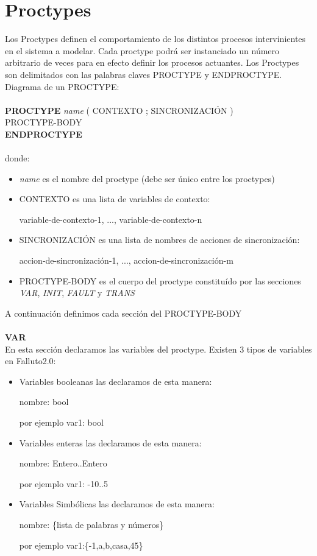 \documentclass[titlepage, 12pt]{book}
\begin{document}
\section{Proctypes}
Los Proctypes definen el comportamiento de los distintos procesos intervinientes en el sistema a modelar. Cada proctype podr\'a ser instanciado un n\'umero arbitrario de veces para en efecto definir los procesos actuantes.
Los Proctypes son delimitados con las palabras claves PROCTYPE y ENDPROCTYPE.
Diagrama de un PROCTYPE:\\\\
\textbf{PROCTYPE} \textit{name} ( CONTEXTO ; SINCRONIZACI\'ON )\\
\indent PROCTYPE-BODY\\
\textbf{ENDPROCTYPE}\\\\
donde:\\
\begin{itemize}
\item \emph{name} es el nombre del proctype (debe ser \'unico entre los proctypes)\\
\item CONTEXTO es una lista de variables de contexto:
\begin{center} variable-de-contexto-1, ..., variable-de-contexto-n\\ \end{center}
\item SINCRONIZACI\'ON es una lista de nombres de acciones de sincronizaci\'on:
\begin{center} accion-de-sincronizaci\'on-1, ..., accion-de-sincronizaci\'on-m\\ \end{center}
\item PROCTYPE-BODY es el cuerpo del proctype constitu\'ido por las secciones \emph{VAR}, \emph{INIT}, \emph{FAULT} y \emph{TRANS}
\end{itemize}

\noindent A continuaci\'on definimos cada secci\'on del PROCTYPE-BODY\\\\
\textbf{VAR}\\
\indent En esta secci\'on declaramos las variables del proctype. Existen 3 tipos de variables en Falluto2.0:
\begin{itemize}
\item Variables booleanas
las declaramos de esta manera: \begin{center} nombre: bool \end{center}
por ejemplo var1: bool
\item Variables enteras
las declaramos de esta manera: \begin{center} nombre: Entero..Entero \end{center}
por ejemplo var1: -10..5
\item Variables Simb\'olicas
las declaramos de esta manera: \begin{center} nombre: \{lista de palabras y n\'umeros\} \end{center}
por ejemplo var1:\{-1,a,b,casa,45\}\\
\end{itemize}
\end{document}
